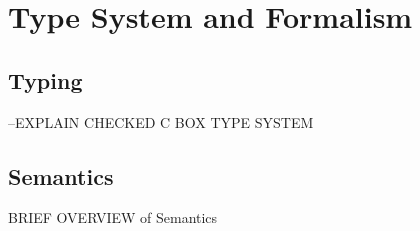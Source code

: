 \section{\systemname Type System and Formalism}
\label{sec:checkcboxtypesystem}
\subsection{Typing}
--EXPLAIN CHECKED C BOX TYPE SYSTEM
\subsection{Semantics}
BRIEF OVERVIEW of Semantics
